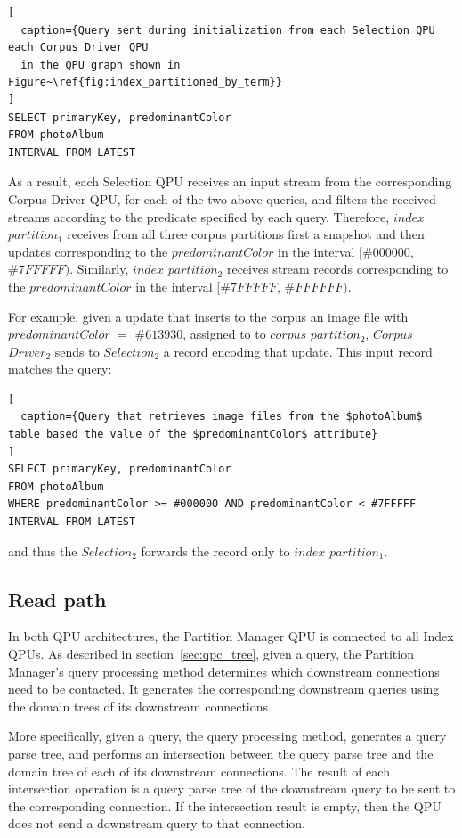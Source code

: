 \begin{lstlisting}[
  caption={Query sent during initialization from each Selection QPU each Corpus Driver QPU
  in the QPU graph shown in Figure~\ref{fig:index_partitioned_by_term}}
]
SELECT primaryKey, predominantColor
FROM photoAlbum
INTERVAL FROM LATEST
\end{lstlisting}

\noindent
As a result, each Selection QPU receives an input stream from the corresponding Corpus Driver QPU,
for each of the two above queries,
and filters the received streams according to the predicate specified by each query.
Therefore, $index$ $partition_1$ receives from all three corpus partitions first a snapshot and then updates
corresponding to the $predominantColor$ in the interval $[\#000000$, $\#7FFFFF)$.
Similarly, $index$ $partition_2$ receives stream records corresponding to the $predominantColor$ in the interval
$[\#7FFFFF$, $\#FFFFFF)$.

For example, given a update that inserts to the corpus an image file with $predominantColor$ $=$ $\#613930$, assigned to to $corpus$
$partition_2$, $Corpus$ $Driver_2$ sends to $Selection_2$ a record encoding that update.
This input record matches the query:

\begin{lstlisting}[
  caption={Query that retrieves image files from the $photoAlbum$ table based the value of the $predominantColor$ attribute}
]
SELECT primaryKey, predominantColor
FROM photoAlbum
WHERE predominantColor >= #000000 AND predominantColor < #7FFFFF
INTERVAL FROM LATEST
\end{lstlisting}

\noindent
and thus the $Selection_2$  forwards the record only to $index$ $partition_1$.

\subsection{Read path}
\label{sec:cs_index_partitioning_read_path}

In both QPU architectures, the Partition Manager QPU is connected to all Index QPUs.
As described in section~\ref{sec:qpc_tree}, given a query,
the Partition Manager's query processing method determines which downstream connections need to be contacted.
It generates the corresponding downstream queries using the domain trees of its downstream connections.

More specifically, given a query,
the query processing method, generates a query parse tree,
and performs an intersection between the query parse tree and the domain tree of each of its downstream connections.
The result of each intersection operation is a query parse tree of the downstream query to be sent to the corresponding
connection.
If the intersection result is empty, then the QPU does not send a downstream query to that connection.

